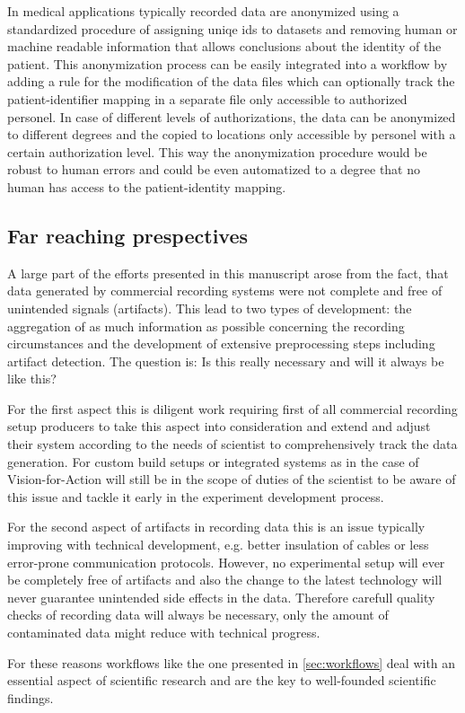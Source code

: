 In medical applications typically recorded data are anonymized using a standardized procedure of assigning uniqe ids to datasets and removing human or machine readable information that allows conclusions about the identity of the patient. This anonymization process can be easily integrated into a workflow by adding a rule for the modification of the data files which can optionally track the patient-identifier mapping in a separate file only accessible to authorized personel. In case of different levels of authorizations, the data can be anonymized to different degrees and the copied to locations only accessible by personel with a certain authorization level. This way the anonymization procedure would be robust to human errors and could be even automatized to a degree that no human has access to the patient-identity mapping.



\subsection{Far reaching prespectives}
A large part of the efforts presented in this manuscript arose from the fact, that data generated by commercial recording systems were not complete and free of unintended signals (artifacts). This lead to two types of development: the aggregation of as much information as possible concerning the recording circumstances and the development of extensive preprocessing steps including artifact detection. The question is: Is this really necessary and will it always be like this?

For the first aspect this is diligent work requiring first of all commercial recording setup producers to take this aspect into consideration and extend and adjust their system according to the needs of scientist to comprehensively track the data generation. For custom build setups or integrated systems as in the case of Vision-for-Action will still be in the scope of duties of the scientist to be aware of this issue and tackle it early in the experiment development process.

For the second aspect of artifacts in recording data this is an issue typically improving with technical development, e.g. better insulation of cables or less error-prone communication protocols. However, no experimental setup will ever be completely free of artifacts and also the change to the latest technology will never guarantee unintended side effects in the data. Therefore carefull quality checks of recording data will always be necessary, only the amount of contaminated data might reduce with technical progress.

For these reasons workflows like the one presented in \cref{sec:workflows} deal with an essential aspect of scientific research and are the key to well-founded scientific findings.
